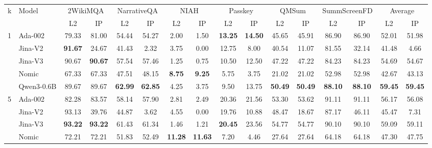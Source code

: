 \begin{sidewaystable}[htbp!]
\centering
\footnotesize
{}
\label{tab:detailed_mrr}
\begin{tabular}{llcccccccccccccc}
\toprule
\multirow{2}{*}{k} & \multirow{2}{*}{Model} & \multicolumn{2}{c}{2WikiMQA} & \multicolumn{2}{c}{NarrativeQA} & \multicolumn{2}{c}{NIAH} & \multicolumn{2}{c}{Passkey} & \multicolumn{2}{c}{QMSum} & \multicolumn{2}{c}{SummScreenFD} & \multicolumn{2}{c}{Average} \\
\cmidrule(lr){3-4} \cmidrule(lr){5-6} \cmidrule(lr){7-8} \cmidrule(lr){9-10} \cmidrule(lr){11-12} \cmidrule(lr){13-14} \cmidrule(lr){15-16}
& & L2 & IP & L2 & IP & L2 & IP & L2 & IP & L2 & IP & L2 & IP & L2 & IP \\
\midrule
\multirow{5}{*}{1} & Ada-002 & 79.33 & 81.00 & 54.44 & 54.27 & 2.00 & 1.50 & \textbf{13.25} & \textbf{14.50} & 45.65 & 45.91 & 86.90 & 86.90 & 52.01 & 51.98 \\
& Jina-V2 & \textbf{91.67} & 24.67 & 41.43 & 2.32 & 3.75 & 0.00 & 12.75 & 8.00 & 40.54 & 11.07 & 81.55 & 32.14 & 41.48 & 4.66 \\
& Jina-V3 & 90.67 & \textbf{90.67} & 57.54 & 57.46 & 1.25 & 0.75 & 10.50 & 12.50 & 47.22 & 47.22 & 84.23 & 84.23 & 54.69 & 54.67 \\
& Nomic & 67.33 & 67.33 & 47.51 & 48.15 & \textbf{8.75} & \textbf{9.25} & 5.75 & 3.75 & 21.02 & 21.02 & 52.98 & 52.98 & 42.67 & 43.13 \\
& Qwen3-0.6B & 89.67 & 89.67 & \textbf{62.99} & \textbf{62.85} & 4.25 & 3.75 & 9.50 & 13.75 & \textbf{50.49} & \textbf{50.49} & \textbf{88.10} & \textbf{88.10} & \textbf{59.45} & \textbf{59.45} \\
\midrule
\multirow{5}{*}{5} & Ada-002 & 82.28 & 83.57 & 58.14 & 57.90 & 2.81 & 2.49 & 20.36 & 21.56 & 53.30 & 53.62 & 91.11 & 91.11 & 56.17 & 56.08 \\
& Jina-V2 & 93.13 & 39.76 & 44.87 & 3.62 & 4.55 & 0.00 & 19.76 & 10.88 & 48.47 & 18.67 & 87.17 & 46.11 & 45.47 & 7.31 \\
& Jina-V3 & \textbf{93.22} & \textbf{93.22} & 61.43 & 61.34 & 1.46 & 1.21 & \textbf{20.45} & 23.56 & 54.77 & 54.77 & 90.10 & 90.10 & 59.09 & 59.11 \\
& Nomic & 72.21 & 72.21 & 51.83 & 52.49 & \textbf{11.28} & \textbf{11.63} & 7.20 & 4.46 & 27.64 & 27.64 & 64.18 & 64.18 & 47.30 & 47.75 \\

\end{tabular}
\end{sidewaystable}
